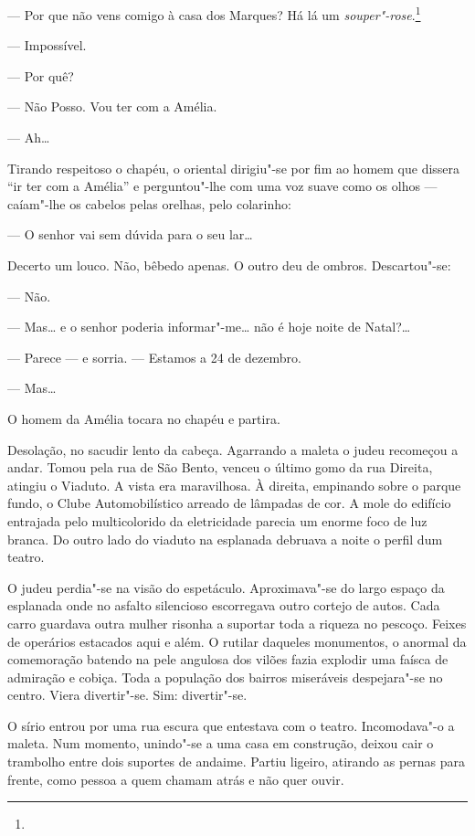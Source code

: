 \begin{linenumbers}
--- Por que não vens comigo à casa dos Marques? Há lá um
\emph{souper"-rose}.\footnote{} %

--- Impossível.

--- Por quê?

--- Não Posso. Vou ter com a Amélia.

--- Ah\ldots{}

Tirando respeitoso o chapéu, o oriental dirigiu"-se por fim ao homem que
dissera ``ir ter com a Amélia'' e perguntou"-lhe com uma voz suave como
os olhos --- caíam"-lhe os cabelos pelas orelhas, pelo colarinho:

--- O senhor vai sem dúvida para o seu lar\ldots{}

Decerto um louco. Não, bêbedo apenas. O outro deu de ombros.
Descartou"-se:

--- Não.

--- Mas\ldots{} e o senhor poderia informar"-me\ldots{} não é hoje noite de
Natal?\ldots{}

--- Parece ­­--- e sorria. --- Estamos a 24 de dezembro.

--- Mas\ldots{}

O homem da Amélia tocara no chapéu e partira.

Desolação, no sacudir lento da cabeça. Agarrando a maleta o judeu
recomeçou a andar. Tomou pela rua de São Bento, venceu o último gomo da
rua Direita, atingiu o Viaduto. A vista era maravilhosa. À direita,
empinando sobre o parque fundo, o Clube Automobilístico arreado de
lâmpadas de cor. A mole do edifício entrajada pelo multicolorido da
eletricidade parecia um enorme foco de luz branca. Do outro lado do
viaduto na esplanada debruava a noite o perfil dum teatro.

O judeu perdia"-se na visão do espetáculo. Aproximava"-se do largo espaço
da esplanada onde no asfalto silencioso escorregava outro cortejo de
autos. Cada carro guardava outra mulher risonha a suportar toda a
riqueza no pescoço. Feixes de operários estacados aqui e além. O rutilar
daqueles monumentos, o anormal da comemoração batendo na pele angulosa
dos vilões fazia explodir uma faísca de admiração e cobiça. Toda a
população dos bairros miseráveis despejara"-se no centro. Viera divertir"-se. Sim: divertir"-se.

O sírio entrou por uma rua escura que entestava com o teatro.
Incomodava"-o a maleta. Num momento, unindo"-se a uma casa em construção,
deixou cair o trambolho entre dois suportes de andaime. Partiu ligeiro,
atirando as pernas para frente, como pessoa a quem chamam atrás e não
quer ouvir.


\end{linenumbers}
